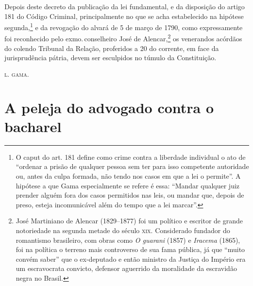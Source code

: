 Depois deste decreto da publicação da lei fundamental, e da disposição
do artigo 181 do Código Criminal, principalmente no que se acha
estabelecido na hipótese segunda,\footnote{O caput do art. 181
  define como crime contra a liberdade individual o ato de ``ordenar a
  prisão de qualquer pessoa sem ter para isso competente autoridade ou,
  antes da culpa formada, não tendo nos casos em que a lei o permite''. A
  hipótese a que Gama especialmente se refere é essa: ``Mandar qualquer
  juiz prender alguém fora dos casos permitidos nas leis, ou mandar que,
  depois de preso, esteja incomunicável além do tempo que a lei marcar''.}
e da revogação do alvará de 5 de março de 1790, como expressamente foi
reconhecido pelo exmo.\,conselheiro José de Alencar,\footnote{José
  Martiniano de Alencar (1829--1877) foi um político e escritor de grande
  notoriedade na segunda metade do século \textsc{xix}. Considerado fundador do
  romantismo brasileiro, com obras como \emph{O guarani} (1857) e
  \emph{Iracema} (1865), foi na política o terreno mais controverso de
  sua fama pública, já que ``muito convém saber'' que o ex-deputado e
  então ministro da Justiça do Império era um escravocrata convicto,
  defensor aguerrido da moralidade da escravidão negra no Brasil.}
os venerandos acórdãos do
colendo Tribunal da Relação, proferidos a 20 do corrente, em face da
jurisprudência pátria, devem ser esculpidos no túmulo da Constituição.\medskip
{}

\hfill\textsc{l. gama.}

\part{A peleja do advogado contra o bacharel}

